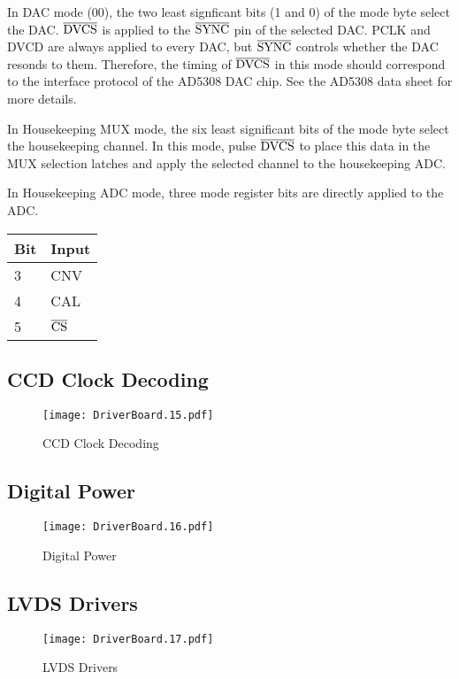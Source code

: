\documentclass[a4paper,12pt]{article}
\begin{document}
In DAC mode (00), the two least signficant bits (1 and 0) of the mode byte select the DAC. $\overline{\textup{DVCS}}$ is applied to the $\overline{\textup{SYNC}}$ pin of the selected DAC. PCLK and DVCD are always applied to every DAC, but $\overline{\textup{SYNC}}$ controls whether the DAC resonds to them. Therefore, the timing of $\overline{\textup{DVCS}}$ in this mode should correspond to the interface protocol of the AD5308 DAC chip. See the AD5308 data sheet for more details.

In Housekeeping MUX mode, the six least significant bits of the mode byte select the housekeeping channel. In this mode, pulse $\overline{\textup{DVCS}}$ to place this data in the MUX selection latches and apply the selected channel to the housekeeping ADC.

In Housekeeping ADC mode, three mode register bits are directly applied to the ADC.

\begin{tabular}{|l|l|}
\hline
Bit & Input \\
\hline
3 & CNV \\
\hline
4 & CAL \\
\hline
5 & $\overline{\textup{CS}}$ \\
\hline
\end{tabular}


\subsection{CCD Clock Decoding}
   \begin{figure}
   \begin{center}
   \texttt{[image: DriverBoard.15.pdf]}
   \end{center}
   \caption{CCD Clock Decoding}
   \end{figure}

\subsection{Digital Power}
   \begin{figure}
   \begin{center}
   \texttt{[image: DriverBoard.16.pdf]}
   \end{center}
   \caption{Digital Power}
   \end{figure}

\subsection{LVDS Drivers}
   \begin{figure}
   \begin{center}
   \texttt{[image: DriverBoard.17.pdf]}
   \end{center}
   \caption{LVDS Drivers}
   \end{figure}
\end{document}
